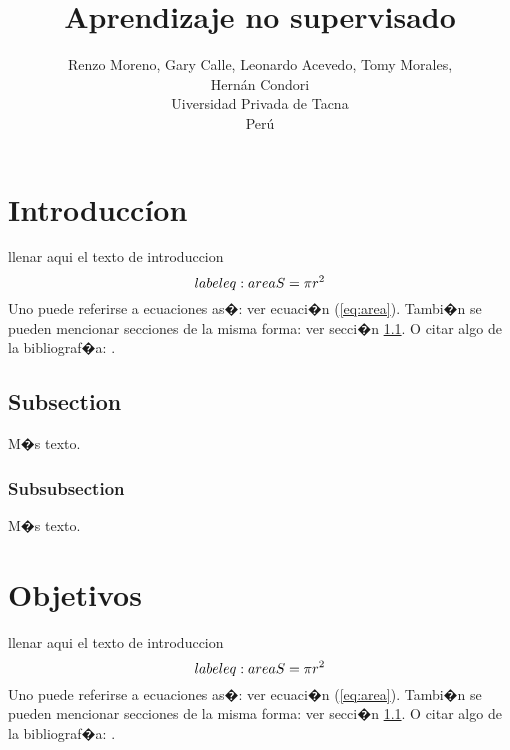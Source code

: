 \documentclass{article}
\title{Aprendizaje no supervisado}
\author{Renzo Moreno, Gary Calle, Leonardo Acevedo, Tomy Morales,\\ Hern\'an Condori \\
  \small Uiversidad Privada de Tacna\\
  \small Per\'u
}
\theoremstyle{definition}
\theoremstyle{remark}
\begin{document}
\maketitle


\section{Introducc\'ion}

llenar aqui el texto de introduccion
\begin{equation}\\label{eq:area}
  S = \pi r^2
\end{equation}
Uno puede referirse a ecuaciones as�: ver ecuaci�n (\ref{eq:area}).
Tambi�n se pueden mencionar secciones de la misma forma: ver secci�n
\ref{sec:nada}. O citar algo de la bibliograf�a: \cite{Cd94}.

\subsection{Subsection}\label{sec:nada}

M�s texto.

\subsubsection{Subsubsection}\label{sec:nada2}

M�s texto.







\section{Objetivos}

llenar aqui el texto de introduccion
\begin{equation}\\label{eq:area}
  S = \pi r^2
\end{equation}
Uno puede referirse a ecuaciones as�: ver ecuaci�n (\ref{eq:area}).
Tambi�n se pueden mencionar secciones de la misma forma: ver secci�n
\ref{sec:nada}. O citar algo de la bibliograf�a: \cite{Cd94}.
\end{document}
